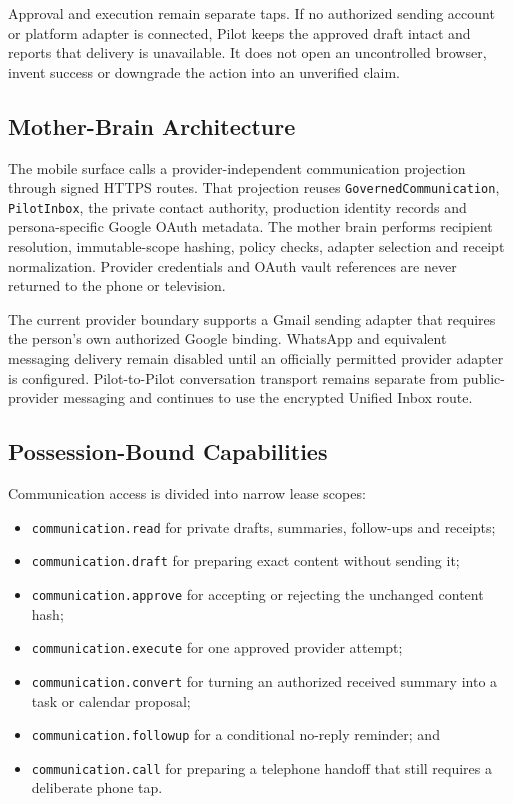 Approval and execution remain separate taps.  If no authorized sending account or platform adapter
is connected, Pilot keeps the approved draft intact and reports that delivery is unavailable.  It
does not open an uncontrolled browser, invent success or downgrade the action into an unverified
claim.

\subsection{Mother-Brain Architecture}

The mobile surface calls a provider-independent communication projection through signed HTTPS
routes.  That projection reuses \texttt{GovernedCommunication}, \texttt{PilotInbox}, the private
contact authority, production identity records and persona-specific Google OAuth metadata.  The
mother brain performs recipient resolution, immutable-scope hashing, policy checks, adapter
selection and receipt normalization.  Provider credentials and OAuth vault references are never
returned to the phone or television.

The current provider boundary supports a Gmail sending adapter that requires the person's own
authorized Google binding.  WhatsApp and equivalent messaging delivery remain disabled until an
officially permitted provider adapter is configured.  Pilot-to-Pilot conversation transport remains
separate from public-provider messaging and continues to use the encrypted Unified Inbox route.

\subsection{Possession-Bound Capabilities}

Communication access is divided into narrow lease scopes:
\begin{itemize}
  \item \texttt{communication.read} for private drafts, summaries, follow-ups and receipts;
  \item \texttt{communication.draft} for preparing exact content without sending it;
  \item \texttt{communication.approve} for accepting or rejecting the unchanged content hash;
  \item \texttt{communication.execute} for one approved provider attempt;
  \item \texttt{communication.convert} for turning an authorized received summary into a task or calendar proposal;
  \item \texttt{communication.followup} for a conditional no-reply reminder; and
  \item \texttt{communication.call} for preparing a telephone handoff that still requires a deliberate phone tap.
\end{itemize}

